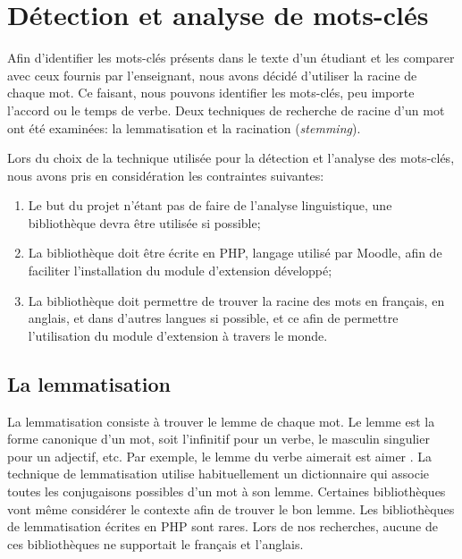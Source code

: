 \chapter{D\'etection et analyse de mots-cl\'es}
\label{chap:keywords}
Afin d'identifier les mots-cl\'es pr\'esents dans le texte d'un \'etudiant et les comparer avec ceux fournis par l'enseignant, nous avons d\'ecid\'e d'utiliser la racine de chaque mot.
Ce faisant, nous pouvons identifier les mots-cl\'es, peu importe l'accord ou le temps de verbe.
Deux techniques de recherche de racine d'un mot ont \'et\'e examin\'ees: la lemmatisation et la racination (\textit{stemming}).

Lors du choix de la technique utilis\'ee pour la d\'etection et l'analyse des mots-cl\'es, nous avons pris en consid\'eration les contraintes suivantes:
\begin{enumerate}
  \item Le but du projet n'\'etant pas de faire de l'analyse linguistique, une biblioth\`eque devra \^etre utilis\'ee si possible;
  \item La biblioth\`eque doit \^etre \'ecrite en PHP, langage utilis\'e par Moodle, afin de faciliter l'installation du module d'extension d\'evelopp\'e;
  \item La biblioth\`eque doit permettre de trouver la racine des mots en fran\c{c}ais, en anglais, et dans d'autres langues si possible, et ce afin de permettre l'utilisation du module d'extension \`a travers le monde.
\end{enumerate}

\section{La lemmatisation}
La lemmatisation consiste \`a trouver le lemme de chaque mot.
Le lemme est la forme canonique d'un mot, soit l'infinitif pour un verbe, le masculin singulier pour un adjectif, etc.
Par exemple, le lemme du verbe \og aimerait \fg{} est \og aimer \fg{}.
La  technique de lemmatisation utilise habituellement un dictionnaire qui associe toutes les conjugaisons possibles d'un mot \`a son lemme.
Certaines biblioth\`eques vont m\^eme consid\'erer le contexte afin de trouver le bon lemme.
Les biblioth\`eques de lemmatisation \'ecrites en PHP sont rares.
Lors de nos recherches, aucune de ces biblioth\`eques ne supportait le fran\c{c}ais et l'anglais.

